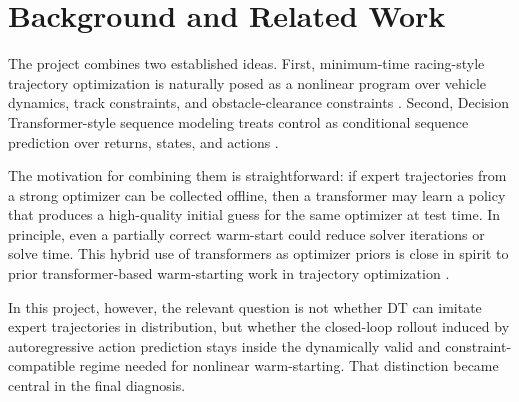 \section{Background and Related Work}

The project combines two established ideas. First, minimum-time racing-style trajectory optimization is naturally posed as a nonlinear program over vehicle dynamics, track constraints, and obstacle-clearance constraints \cite{subositsgerdes2021fidelity,mao2016successive}. Second, Decision Transformer-style sequence modeling treats control as conditional sequence prediction over returns, states, and actions \cite{chen2021decision}.

The motivation for combining them is straightforward: if expert trajectories from a strong optimizer can be collected offline, then a transformer may learn a policy that produces a high-quality initial guess for the same optimizer at test time. In principle, even a partially correct warm-start could reduce solver iterations or solve time. This hybrid use of transformers as optimizer priors is close in spirit to prior transformer-based warm-starting work in trajectory optimization \cite{guffanti2024transformers}.

In this project, however, the relevant question is not whether DT can imitate expert trajectories in distribution, but whether the closed-loop rollout induced by autoregressive action prediction stays inside the dynamically valid and constraint-compatible regime needed for nonlinear warm-starting. That distinction became central in the final diagnosis.
